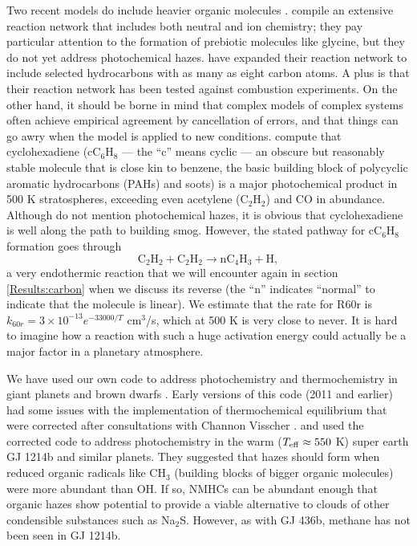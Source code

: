 \documentclass[preprint]{aastex}
\newcounter{reaction}
\begin{document}
Two recent models do include heavier organic molecules \citep{Rimmer2016, Venot2015}.
\citet{Rimmer2016} compile an extensive reaction network that includes both neutral and ion chemistry;
 they pay particular attention to the formation of prebiotic molecules like glycine, but they do not yet address photochemical hazes.
\citet{Venot2015} have expanded their reaction network to include selected hydrocarbons with as many as eight carbon atoms.
A plus is that their reaction network has been tested against combustion experiments.
On the other hand, it should be borne in mind that complex models of complex systems often achieve empirical agreement by cancellation of errors,
and that things can go awry when the model is applied to new conditions.
 \citet{Venot2015} compute that cyclohexadiene (cC$_6$H$_8$ --- the ``c'' means cyclic --- an obscure but reasonably stable
 molecule {\color{red} that is close kin to benzene, the basic building block of {\color{red} polycyclic aromatic hydrocarbons (PAHs)} and soots})
 is a major photochemical product in 500 K stratospheres, exceeding even acetylene (C$_2$H$_2$) and CO in abundance.  
 Although \citet{Venot2015} do not mention photochemical hazes, it is obvious that cyclohexadiene
 is well along the path to building smog.  
 However, the stated pathway for cC$_6$H$_8$ formation goes through  
 \begin{equation}\tag{R60r}
 \mathrm{C}_2\mathrm{H}_2 + \mathrm{C}_2\mathrm{H}_2  \rightarrow \mathrm{nC}_4\mathrm{H}_3 + \mathrm{H},
 \end{equation}
 a very endothermic reaction that we will encounter again in section \ref{Results:carbon} when we discuss its 
 reverse {\color{red} (the ``n'' indicates ``normal'' to indicate that the molecule is linear)}.
 We estimate that the rate for R60r is $k_{60r}= 3\times 10^{-13} e^{-33000/T}$ cm$^{3}$/s, which at 500 K is very close to never.
 It is hard to imagine how a reaction with such a huge activation energy could actually be a major factor in a planetary atmosphere.
 
We have used our own code to address photochemistry and thermochemistry in giant planets and brown dwarfs
\citet{Zahnle1995, Zahnle2009,Zahnle2014}.
Early versions of this code (2011 and earlier) had some issues with the implementation of thermochemical
equilibrium that were corrected after consultations with Channon Visscher \citep[see][]{Visscher2011}. 
\citet{Miller-Ricci2012} and \citet{Morley2013} used the corrected code 
 to address photochemistry in the warm ($T_{\rm eff}\approx 550$ K) super earth GJ 1214b and similar planets.
They suggested that hazes should form when reduced organic radicals like CH$_3$ (building blocks of
bigger organic molecules) were more abundant than OH.
If so, NMHCs can be abundant enough that organic hazes show potential to provide
a viable alternative to clouds of other condensible substances such as Na$_2$S.     
 However, as with GJ 436b, methane has not been seen in GJ 1214b.
\end{document}
